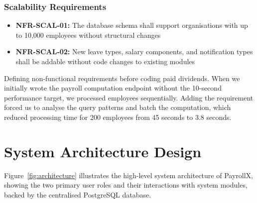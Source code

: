 \documentclass[12pt,a4paper]{report}
\begin{document}
\subsubsection{Scalability Requirements}
\begin{itemize}
    \item \textbf{NFR-SCAL-01:} The database schema shall support organisations with up to 10,000 employees without structural changes
    \item \textbf{NFR-SCAL-02:} New leave types, salary components, and notification types shall be addable without code changes to existing modules
\end{itemize}

\begin{lessonbox}
Defining non-functional requirements before coding paid dividends. When we initially wrote the payroll computation endpoint without the 10-second performance target, we processed employees sequentially. Adding the requirement forced us to analyse the query patterns and batch the computation, which reduced processing time for 200 employees from 45 seconds to 3.8 seconds.
\end{lessonbox}

\section{System Architecture Design}

Figure~\ref{fig:architecture} illustrates the high-level system architecture of PayrollX, showing the two primary user roles and their interactions with system modules, backed by the centralised PostgreSQL database.
\end{document}
